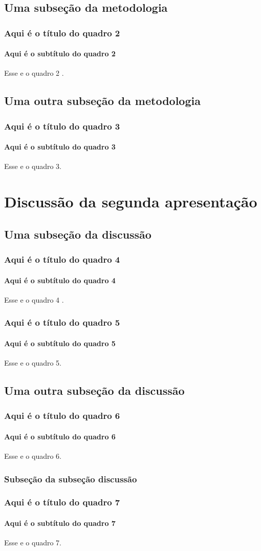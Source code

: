 \documentclass[aspectratio=169]{beamer}
\begin{document}
			\subsection{Uma subseção da metodologia}
				\begin{frame}
					\frametitle{Aqui é o título do quadro 2}
					\framesubtitle{Aqui é o subtítulo do quadro 2}
					Esse e o quadro 2 \cite{meuartigo}.
				\end{frame}	
			
			\subsection{Uma outra subseção da metodologia}
				\begin{frame}
					\frametitle{Aqui é o título do quadro 3}
					\framesubtitle{Aqui é o subtítulo do quadro 3}
					Esse e o quadro 3.
				\end{frame}	
		
		\section[Discussão]{Discussão da segunda apresentação}
			\subsection{Uma subseção da discussão}
				\begin{frame}
					\frametitle{Aqui é o título do quadro 4}
					\framesubtitle{Aqui é o subtítulo do quadro 4}
					Esse e o quadro 4 \cite{meulivro}.
				\end{frame}
				\begin{frame}
					\frametitle{Aqui é o título do quadro 5}
					\framesubtitle{Aqui é o subtítulo do quadro 5}
					Esse e o quadro 5.
				\end{frame}
			
			\subsection{Uma outra subseção da discussão}
				\begin{frame}
					\frametitle{Aqui é o título do quadro 6}
					\framesubtitle{Aqui é o subtítulo do quadro 6}
					Esse e o quadro 6.
				\end{frame}
				
				\subsubsection{Subseção da subseção discussão}
					\begin{frame}
						\frametitle{Aqui é o título do quadro 7}
						\framesubtitle{Aqui é o subtítulo do quadro 7}
						Esse e o quadro 7.
					\end{frame}
		
\end{document}
